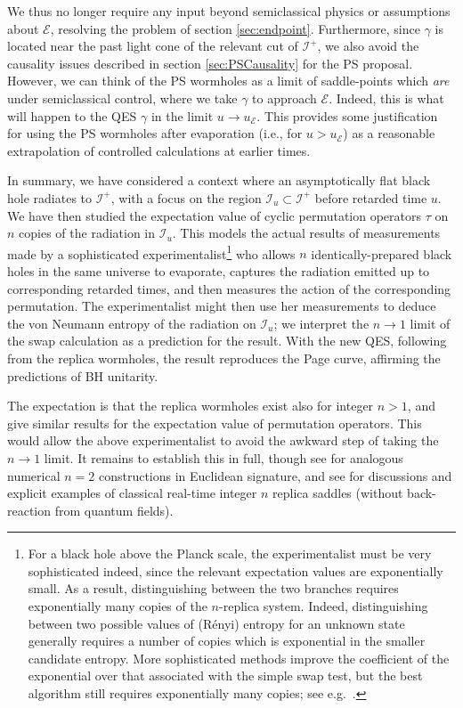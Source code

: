 \documentclass[letterpaper,12pt]{article}
\newcommand*{\scri}{\mathscr{I}} %
\newcommand*{\evap}{\mathscr{E}} %
\begin{document}
We thus no longer require any input beyond semiclassical physics or assumptions about $\evap$, resolving the problem of section \ref{sec:endpoint}. Furthermore, since $\gamma$ is located near the past light cone of the relevant cut of $\scri^+$, we also avoid the causality issues described in section \ref{sec:PSCausality} for the PS proposal. However, we can think of the PS wormholes as a limit of saddle-points which \emph{are} under semiclassical control, where we take $\gamma$ to approach $\evap$. Indeed, this is what will happen to the QES $\gamma$ in the limit $u\to u_\evap$. This provides some justification for using the PS wormholes after evaporation (i.e., for $u>u_\evap$) as a reasonable extrapolation of controlled calculations at earlier times.


In summary, we have considered a context where an asymptotically flat black hole radiates to $\scri^+$, with a focus on the region $\scri_u \subset \scri^+$ before retarded time $u$.  We have then studied the expectation value of cyclic permutation operators $\tau$ on $n$ copies of the radiation in $\scri_u$. This models the actual results of measurements made by a sophisticated experimentalist\footnote{For a black hole above the Planck scale, the experimentalist must be very sophisticated indeed, since the relevant expectation values are exponentially small.  As a result, distinguishing between the two branches requires exponentially many copies of the $n$-replica system.  Indeed, distinguishing between two possible values of (R\'enyi) entropy for an unknown state generally requires a number of copies which is exponential in the smaller candidate entropy. More sophisticated methods improve the coefficient of the exponential over that associated with the simple swap test, but the best algorithm still requires exponentially many copies; see e.g.\ \cite{acharya2019measuring}.} who allows $n$ identically-prepared black holes in the same universe to evaporate, captures the radiation emitted up to corresponding retarded times, and then measures the action of the corresponding permutation. The experimentalist might then use her measurements to deduce the von Neumann entropy of the radiation on $\scri_u$; we interpret the $n\to 1$ limit of the swap calculation as a prediction for the result. With the new QES, following from the replica wormholes, the result reproduces the Page curve, affirming the predictions of BH unitarity.

The expectation is that the replica wormholes exist also for integer $n>1$, and give similar results for the expectation value of permutation operators.  This would allow the above experimentalist to avoid the awkward step of taking the $n\rightarrow 1$ limit.  It remains to establish this in full, though see \cite{Mirbabayi:2020fyk} for analogous numerical $n=2$ constructions in Euclidean signature, and see \cite{CDMRW} for discussions and explicit examples of classical real-time integer $n$ replica saddles (without back-reaction from quantum fields).
\end{document}
